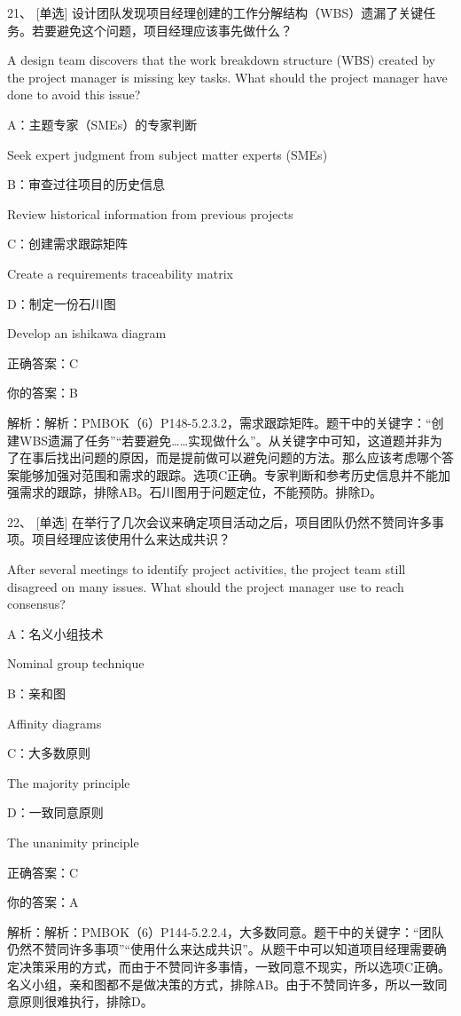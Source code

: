 21、 [单选] 设计团队发现项目经理创建的工作分解结构（WBS）遗漏了关键任务。若要避免这个问题，项目经理应该事先做什么？

A design team discovers that the work breakdown structure (WBS) created by the project manager is missing key tasks. What should the project manager have done to avoid this issue?

A：主题专家（SMEs）的专家判断

Seek expert judgment from subject matter experts (SMEs)

B：审查过往项目的历史信息

Review historical information from previous projects

C：创建需求跟踪矩阵

Create a requirements traceability matrix

D：制定一份石川图

Develop an ishikawa diagram

正确答案：C

你的答案：B

解析：解析：PMBOK（6）P148-5.2.3.2，需求跟踪矩阵。题干中的关键字：“创建WBS遗漏了任务”“若要避免……实现做什么”。从关键字中可知，这道题并非为了在事后找出问题的原因，而是提前做可以避免问题的方法。那么应该考虑哪个答案能够加强对范围和需求的跟踪。选项C正确。专家判断和参考历史信息并不能加强需求的跟踪，排除AB。石川图用于问题定位，不能预防。排除D。


22、 [单选] 在举行了几次会议来确定项目活动之后，项目团队仍然不赞同许多事项。项目经理应该使用什么来达成共识？

After several meetings to identify project activities, the project team still disagreed on many issues. What should the project manager use to reach consensus?

A：名义小组技术

Nominal group technique

B：亲和图

Affinity diagrams

C：大多数原则

The majority principle

D：一致同意原则

The unanimity principle

正确答案：C

你的答案：A

解析：解析：PMBOK（6）P144-5.2.2.4，大多数同意。题干中的关键字：“团队仍然不赞同许多事项”“使用什么来达成共识”。从题干中可以知道项目经理需要确定决策采用的方式，而由于不赞同许多事情，一致同意不现实，所以选项C正确。名义小组，亲和图都不是做决策的方式，排除AB。由于不赞同许多，所以一致同意原则很难执行，排除D。



